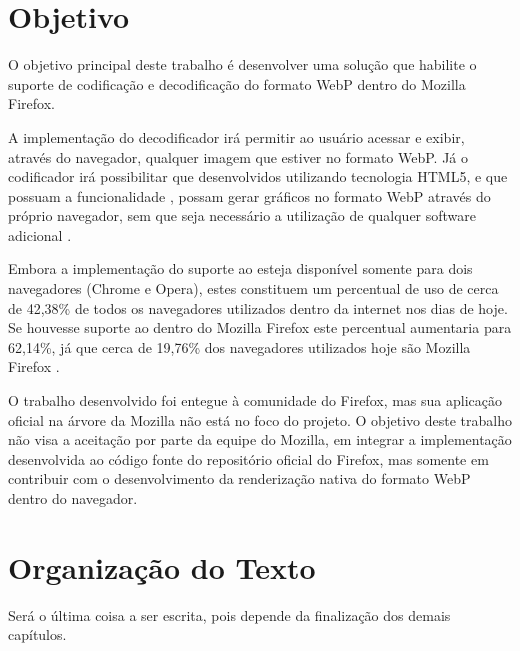 \documentclass[espaco=simples,appendix=Name]{abnt}
\begin{document}
\section{Objetivo}

O objetivo principal deste trabalho é desenvolver uma solução que habilite o suporte de codificação e decodificação do formato WebP dentro do Mozilla Firefox. 

A implementação do decodificador irá permitir ao usuário acessar e exibir, através do navegador, qualquer imagem que estiver no formato WebP. Já o codificador irá possibilitar que  desenvolvidos utilizando tecnologia HTML5, e que possuam a funcionalidade , possam gerar gráficos no formato WebP através do próprio navegador, sem que seja necessário a utilização de qualquer software adicional \cite{pfeiffer2010definitive}.

Embora a implementação do suporte ao  esteja disponível somente para dois navegadores (Chrome e Opera), estes constituem um percentual de uso de cerca de 42,38\% de todos os navegadores utilizados dentro da internet nos dias de hoje. Se houvesse suporte ao  dentro do Mozilla Firefox este percentual aumentaria para 62,14\%, já que cerca de 19,76\% dos navegadores utilizados hoje são Mozilla Firefox \cite{BrowserStats}.

O trabalho desenvolvido foi entegue à comunidade do Firefox, mas sua aplicação oficial na árvore da Mozilla não está no foco do projeto. O objetivo deste trabalho não visa a aceitação por parte da equipe do Mozilla, em integrar a implementação desenvolvida ao código fonte do repositório oficial do Firefox, mas somente em contribuir com o desenvolvimento da renderização nativa do formato WebP dentro do navegador.

\section{Organização do Texto}

Será o última coisa a ser escrita, pois depende da finalização dos demais capítulos.
%
\end{document}
